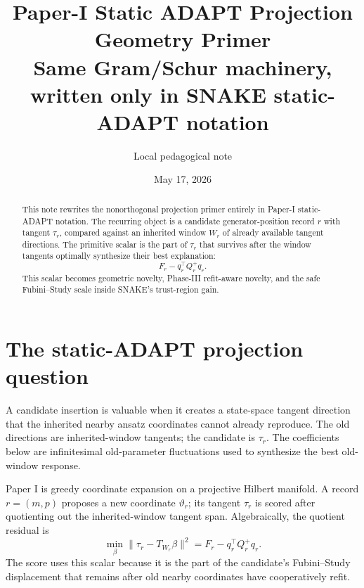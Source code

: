 \documentclass[10pt,twocolumn]{article}
\title{Paper-I Static ADAPT Projection Geometry Primer\\[-1mm]
\large Same Gram/Schur machinery, written only in SNAKE static-ADAPT notation}
\author{Local pedagogical note}
\date{May 17, 2026}
\begin{document}
\maketitle

\begin{abstract}
This note rewrites the nonorthogonal projection primer entirely in Paper-I static-ADAPT notation. The recurring object is a candidate generator-position record \(r\) with tangent \(\tau_r\), compared against an inherited window \(W_r\) of already available tangent directions. The primitive scalar is the part of \(\tau_r\) that survives after the window tangents optimally synthesize their best explanation:
\[
F_r-q_r^\top Q_r^+q_r.
\]
This scalar becomes geometric novelty, Phase-III refit-aware novelty, and the safe Fubini--Study scale inside SNAKE's trust-region gain.
\end{abstract}

\section{The static-ADAPT projection question}

\begin{intuitionbox}
A candidate insertion is valuable when it creates a state-space tangent direction that the inherited nearby ansatz coordinates cannot already reproduce. The old directions are inherited-window tangents; the candidate is \(\tau_r\). The coefficients below are infinitesimal old-parameter fluctuations used to synthesize the best old-window response.
\end{intuitionbox}

\begin{jargonbox}
Paper I is greedy coordinate expansion on a projective Hilbert manifold. A record \(r=(m,p)\) proposes a new coordinate \(\vartheta_r\); its tangent \(\tau_r\) is scored after quotienting out the inherited-window tangent span. Algebraically, the quotient residual is
\[
\min_\beta\|\tau_r-T_{W_r}\beta\|^2
=F_r-q_r^\top Q_r^+q_r.
\]
The score uses this scalar because it is the part of the candidate's Fubini--Study displacement that remains after old nearby coordinates have cooperatively refit.
\end{jargonbox}
\end{document}
